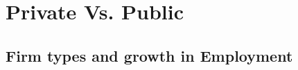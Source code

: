 \documentclass[12pt,notitlepage]{article}
\begin{document}
\begin{table}[!htpb]
    \centering
    \caption{France}
    \label{tab:my_label}
\end{table}

\begin{table}[!htpb]
    \centering
    \caption{Hungary}
    \label{tab:my_label}
\end{table}

\begin{table}[!htpb]
    \centering
    \caption{Czech Republic}
    \label{tab:my_label}
\end{table}
\pagebreak








\appendix

\FloatBarrier
\section{Private Vs. Public} %
\label{sec:private_vs_public}
\FloatBarrier



\subsection{Firm types and growth in Employment}
\end{document}

